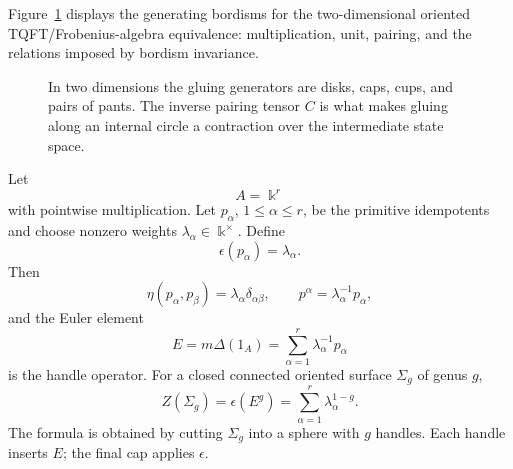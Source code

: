 Figure~\ref{fig:tqft-frobenius-generators} displays the generating bordisms for
the two-dimensional oriented TQFT/Frobenius-algebra equivalence: multiplication,
unit, pairing, and the relations imposed by bordism invariance.

\begin{figure}[H]
\centering
{}
\caption{In two dimensions the gluing generators are disks, caps, cups, and
pairs of pants.  The inverse pairing tensor \(C\) is what makes gluing along
an internal circle a contraction over the intermediate state space.}
\label{fig:tqft-frobenius-generators}
\end{figure}

\begin{example}
\label{ex:semisimple-2d-tqft}
Let
\[
  A=\Bbbk^r
\]
with pointwise multiplication.  Let \(p_\alpha\), \(1\le\alpha\le r\), be the
primitive idempotents and choose nonzero weights
\(\lambda_\alpha\in\Bbbk^\times\).  Define
\[
  \epsilon(p_\alpha)=\lambda_\alpha .
\]
Then
\[
  \eta(p_\alpha,p_\beta)=\lambda_\alpha\delta_{\alpha\beta},
  \qquad
  p^\alpha=\lambda_\alpha^{-1}p_\alpha,
\]
and the Euler element
\[
  E=m\Delta(1_A)=\sum_{\alpha=1}^{r}\lambda_\alpha^{-1}p_\alpha
\]
is the handle operator.  For a closed connected oriented surface
\(\Sigma_g\) of genus \(g\),
\begin{equation}
  Z(\Sigma_g)=\epsilon(E^g)
  =
  \sum_{\alpha=1}^{r}\lambda_\alpha^{1-g}.
  \label{eq:semisimple-2d-tqft-genus-partition}
\end{equation}
The formula is obtained by cutting \(\Sigma_g\) into a sphere with \(g\)
handles.  Each handle inserts \(E\); the final cap applies \(\epsilon\).
\end{example}

